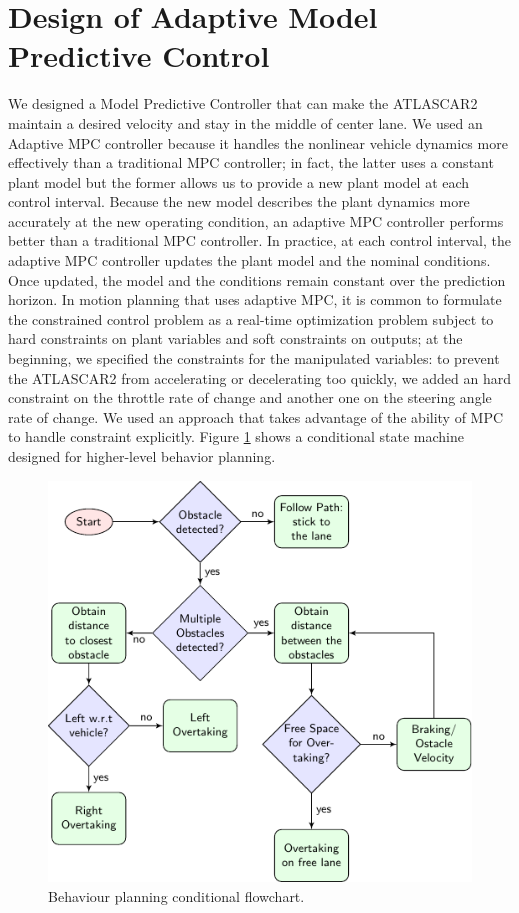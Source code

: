 \section{Design of Adaptive Model Predictive Control}
We designed a Model Predictive Controller that can make the ATLASCAR2 maintain a desired velocity and stay in the middle of center lane. We used an Adaptive MPC controller because it handles the nonlinear vehicle dynamics more effectively than a traditional MPC controller; in fact, the latter uses a constant plant model but the former allows us to provide a new plant model at each control interval. Because the new model describes the plant dynamics more accurately at the new operating condition, an adaptive MPC controller performs better than a traditional MPC controller. In practice, at each control interval, the adaptive MPC controller updates the plant model and the nominal conditions. Once updated, the model and the conditions remain constant over the prediction horizon. In motion planning that uses adaptive MPC, it is common to formulate the constrained control problem as a real-time optimization problem subject to hard constraints on plant variables and soft constraints on outputs; at the beginning, we specified the constraints for the manipulated variables: to prevent the ATLASCAR2 from accelerating or decelerating too quickly, we added an hard constraint on the throttle rate of change and another one on the steering angle rate of change. We used an approach that takes advantage of the ability of MPC to handle constraint explicitly. Figure \ref{fig:flowchart} shows a conditional state machine designed for higher-level behavior planning.
\begin{figure}[!b]
	\centering
	\includegraphics[width=\textwidth]{../figure/flowchart/flowchart.pdf}
	\caption{Behaviour planning conditional flowchart.}
	\label{fig:flowchart}
\end{figure}

